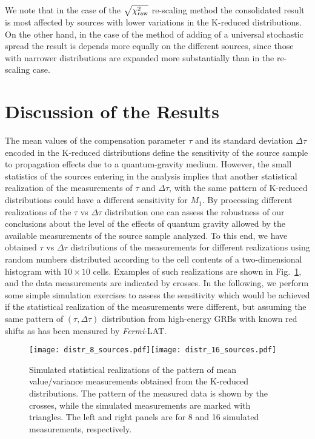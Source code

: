 \documentclass[12pt]{article}
\newcommand{\lat}{{\it Fermi}-LAT}
\begin{document}
{We note that in the case of the $\sqrt{\chi_{\rm raw}^2}$ re-scaling method
the consolidated result is most affected by sources with lower variations
in the K-reduced distributions. On the other hand, in the case of the method
of adding of a universal stochastic spread  the result is depends more equally
on the different sources, since those with narrower distributions are expanded more substantially
than in the re-scaling case.


\section{Discussion of the Results}
\label{sec:concl}

The mean values of the compensation parameter $\tau $ and its
standard deviation $\Delta\tau $ encoded in the K-reduced distributions define the sensitivity of
the source sample to propagation effects due to a quantum-gravity medium.
However, the small statistics of the sources entering in the analysis implies
that another statistical realization of the measurements
of  $\tau $ and $\Delta\tau $, with the same pattern of K-reduced
distributions could have a different sensitivity
for $M_1$. By processing different realizations of the $\tau $ vs $\Delta\tau $
distribution one can assess the robustness of our conclusions about the level of the effects of quantum gravity
allowed by the available measurements of the source sample analyzed. To this
end, we have obtained $\tau $ vs $\Delta\tau $
distributions of the measurements for different realizations using random numbers distributed
according to the cell contents of a two-dimensional histogram with $10\times 10$ cells.
Examples of such realizations are shown in Fig.~\ref{fig:DISTR1}, and the data measurements are
indicated by crosses. In the following, we perform some simple simulation exercises to assess the sensitivity which would be achieved
if the statistical realization of the measurements were different, but assuming the same pattern of $(\tau , \Delta\tau )$
distribution from high-energy GRBs with known red shifts as has been measured by \lat.

\begin{figure}
\centering
\texttt{[image: distr\_8\_sources.pdf]}\hspace{0cm}\texttt{[image: distr\_16\_sources.pdf]}
\vspace{-0.4cm}
\caption{Simulated statistical realizations of the pattern of mean value/variance measurements obtained from the
K-reduced distributions. The pattern of the measured data is shown by the crosses, while the simulated
measurements are marked with triangles. The left and right panels are for 8 and 16 simulated
measurements, respectively.}
\label{fig:DISTR1}
\end{figure}

}
\end{document}

